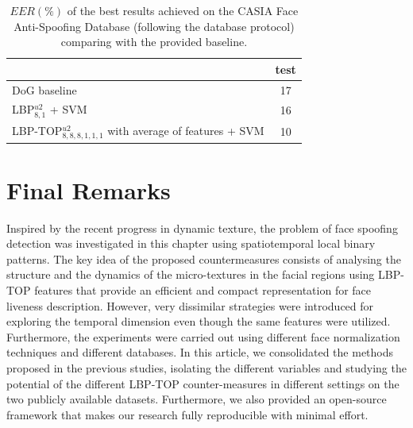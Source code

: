 \begin{table}
   \caption{$EER(\%)$ of the best results achieved on the CASIA Face Anti-Spoofing Database (following the database protocol) comparing with the provided baseline.}
   \begin{center}

     \begin{tabular}{l | c |}
         \cline{2-2}
         & \textbf{test} \\ \hline
         \multicolumn{1}{|l|}{DoG baseline \cite{zhangface}} & 17 \\ \hline
         \multicolumn{1}{|l|}{LBP$_{8,1}^{u2}$ + SVM} & 16 \\ \hline
         \multicolumn{1}{|l|}{LBP-TOP$^{u2}_{8,8,8,1,1,1}$ with average of features + SVM} & 10  \\ \hline

     \end{tabular}
   \end{center}
   \label{tb_CASIA_Results}
\end{table}


\section{Final Remarks}
\label{sec_conclusion}

Inspired by the recent progress in dynamic texture, the problem of face spoofing detection was investigated in this chapter using spatiotemporal local binary patterns. The key idea of the proposed countermeasures consists of analysing the structure and the dynamics of the micro-textures in the facial regions using LBP-TOP features that provide an efficient and compact representation for face liveness description. However, very dissimilar strategies were introduced for exploring the temporal dimension even though the same features were utilized. Furthermore, the experiments were carried out using different face normalization techniques and different databases. In this article, we consolidated the methods proposed in the previous studies, isolating the different variables and studying the potential of the different LBP-TOP counter-measures in different settings on the two publicly available datasets. Furthermore, we also provided an open-source framework that makes our research fully reproducible with minimal effort.


